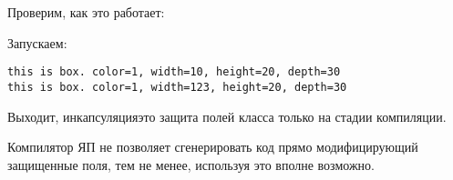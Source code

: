 

Проверим, как это работает:



Запускаем:

\begin{lstlisting}
this is box. color=1, width=10, height=20, depth=30
this is box. color=1, width=123, height=20, depth=30
\end{lstlisting}

Выходит, инкапсуляция\EMDASH{}это защита полей класса только на стадии компиляции.

Компилятор ЯП \Cpp не позволяет сгенерировать код прямо
модифицирующий защищенные поля, тем не менее, используя \EMDASH{} 
это вполне возможно.


